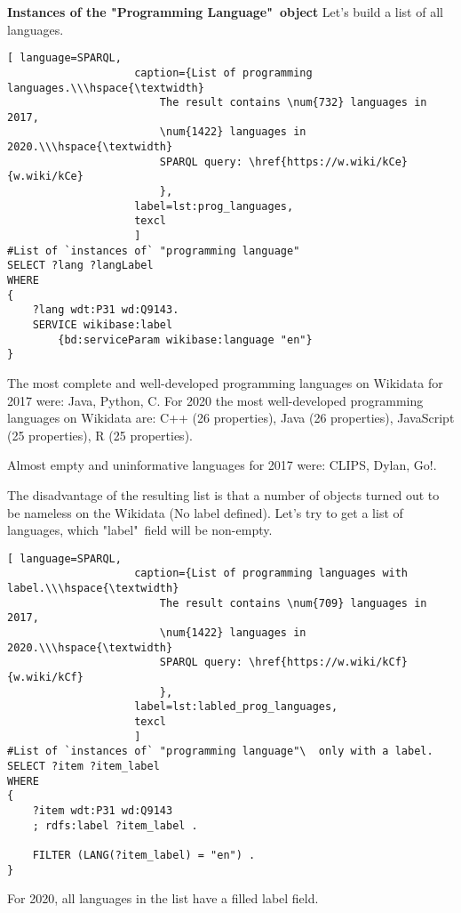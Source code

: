 \textbf{Instances of the "Programming Language"\  object}\newline
Let's build a list of all languages.
\begin{lstlisting}[ language=SPARQL, 
                    caption={List of programming languages.\\\hspace{\textwidth}
                        The result contains \num{732} languages in 2017, 
                        \num{1422} languages in 2020.\\\hspace{\textwidth}
                        SPARQL query: \href{https://w.wiki/kCe}{w.wiki/kCe}
                        },
                    label=lst:prog_languages,
                    texcl 
                    ]
#List of `instances of` "programming language" 
SELECT ?lang ?langLabel
WHERE
{
    ?lang wdt:P31 wd:Q9143.
    SERVICE wikibase:label 
		{bd:serviceParam wikibase:language "en"}
}
\end{lstlisting}%

The most complete and well-developed programming languages on Wikidata for 2017 were: Java, Python, C. For 2020 the most well-developed programming languages on Wikidata are: C++ (26 properties), Java (26 properties), JavaScript (25 properties), R (25 properties).

Almost empty and uninformative languages for 2017 were: CLIPS, Dylan, Go!.

The disadvantage of the resulting list is that a number of objects turned out to be nameless on the Wikidata (No label defined). Let's try to get a list of languages, which "label"\  field will be non-empty.

\begin{lstlisting}[ language=SPARQL, 
                    caption={List of programming languages with label.\\\hspace{\textwidth}
                        The result contains \num{709} languages in 2017, 
                        \num{1422} languages in 2020.\\\hspace{\textwidth}
                        SPARQL query: \href{https://w.wiki/kCf}{w.wiki/kCf}
                        },
                    label=lst:labled_prog_languages,
                    texcl 
                    ]
#List of `instances of` "programming language"\  only with a label.
SELECT ?item ?item_label
WHERE
{
    ?item wdt:P31 wd:Q9143
    ; rdfs:label ?item_label . 

    FILTER (LANG(?item_label) = "en") . 
}
\end{lstlisting}%
For 2020, all languages in the list have a filled label field.

